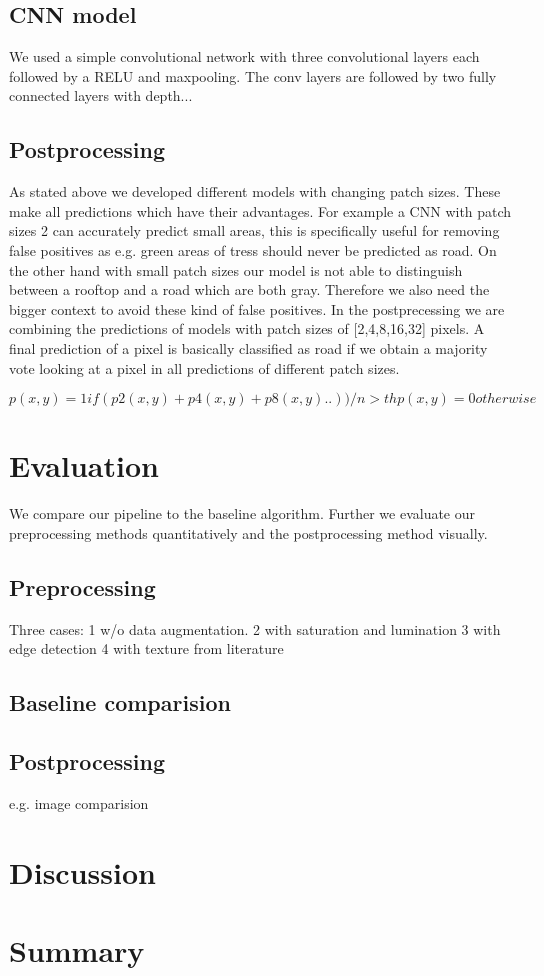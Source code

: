 \documentclass[10pt,conference,compsocconf]{IEEEtran}
\begin{document}
\subsection{CNN model}
We used a simple convolutional network with three convolutional layers each followed by a RELU and maxpooling. The conv layers are followed by two fully connected layers with depth...


\subsection{Postprocessing}
As stated above we developed different models with changing patch sizes. These make all predictions which have their advantages. For example a CNN with patch sizes 2 can accurately predict small areas, this is specifically useful for removing false positives as e.g. green areas of tress should never be predicted as road. On the other hand with small patch sizes our model is not able to distinguish between a rooftop and a road which are both gray. Therefore we also need the bigger context to avoid these kind of false positives. In the postprecessing we are combining the predictions of models with patch sizes of [2,4,8,16,32] pixels. A final prediction of a pixel is basically classified as road if we obtain a majority vote looking at a pixel in all predictions of different patch sizes. 

$p(x,y) = 1 if (p2(x,y)+p4(x,y)+p8(x,y)..))/n > th
p(x,y) = 0 otherwise$




\section{Evaluation}
We compare our pipeline to the baseline algorithm. Further we evaluate our preprocessing methods quantitatively and the postprocessing method visually. 

\subsection{Preprocessing}

Three cases: 
1 w/o data augmentation.
2 with saturation and lumination
3 with edge detection
4 with texture from literature

\subsection{Baseline comparision}

\subsection{Postprocessing}
e.g. image comparision


\section{Discussion}



\section{Summary}




\end{document}
